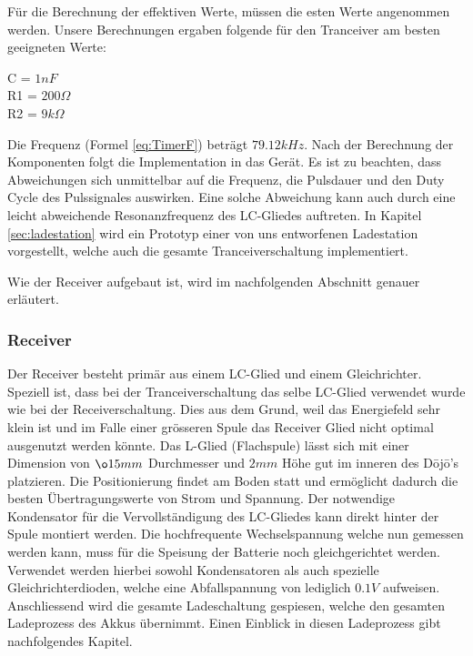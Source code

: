 Für die Berechnung der effektiven Werte, müssen die esten Werte angenommen werden. Unsere Berechnungen ergaben folgende für den Tranceiver am besten geeigneten Werte:

\begin{center}
C = $1nF$\\
R1 = $200\Omega$\\
R2 = $9k\Omega$\\
\end{center}
 
Die Frequenz (Formel \ref{eq:TimerF}) beträgt  $79.12kHz$. Nach der Berechnung der Komponenten folgt die Implementation in das Gerät. Es ist zu beachten, dass Abweichungen sich unmittelbar auf die Frequenz, die Pulsdauer und den Duty Cycle des Pulssignales auswirken. Eine solche Abweichung kann auch durch eine leicht abweichende Resonanzfrequenz des LC-Gliedes auftreten. In Kapitel \ref{sec:ladestation} wird ein Prototyp einer von uns entworfenen Ladestation vorgestellt, welche auch die gesamte Tranceiverschaltung implementiert.

Wie der Receiver aufgebaut ist, wird im nachfolgenden Abschnitt genauer erläutert.

\subsubsection*{Receiver}
Der Receiver besteht primär aus einem LC-Glied und einem Gleichrichter. Speziell ist, dass bei der Tranceiverschaltung das selbe LC-Glied verwendet wurde wie bei der Receiverschaltung. Dies aus dem Grund, weil das Energiefeld sehr klein ist und im Falle einer grösseren Spule das Receiver Glied nicht optimal ausgenutzt werden könnte. Das L-Glied (Flachspule) lässt sich mit einer Dimension von $\o 15mm$ Durchmesser und $2mm$ Höhe gut im inneren des Dōjō’s platzieren. Die Positionierung findet am Boden statt und ermöglicht dadurch die besten Übertragungswerte von Strom und Spannung. Der notwendige Kondensator für die Vervollständigung des LC-Gliedes kann direkt hinter der Spule montiert werden. Die hochfrequente Wechselspannung welche nun gemessen werden kann, muss für die Speisung der Batterie noch gleichgerichtet werden. Verwendet werden hierbei sowohl Kondensatoren als auch spezielle Gleichrichterdioden, welche eine Abfallspannung von lediglich $0.1V$ aufweisen. Anschliessend wird die gesamte Ladeschaltung gespiesen, welche den gesamten Ladeprozess des Akkus übernimmt. Einen Einblick in diesen Ladeprozess gibt nachfolgendes Kapitel.
